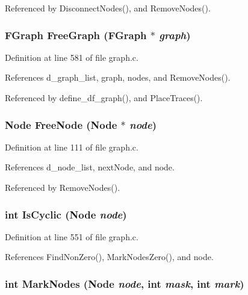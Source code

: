 Referenced by Disconnect\-Nodes(), and Remove\-Nodes().
\subsubsection{\setlength{\rightskip}{0pt plus 5cm}\bf{FGraph} Free\-Graph (\bf{FGraph} $\ast$ {\em graph})}\label{graph_8c_21f7025d01cd1f76fa141deb52814f74}




Definition at line 581 of file graph.c.

References d\_\-graph\_\-list, graph, nodes, and Remove\-Nodes().

Referenced by define\_\-df\_\-graph(), and Place\-Traces().
\subsubsection{\setlength{\rightskip}{0pt plus 5cm}\bf{Node} Free\-Node (\bf{Node} $\ast$ {\em node})}\label{graph_8c_26179fc2f0d21aa44b2e5a57265a52c5}




Definition at line 111 of file graph.c.

References d\_\-node\_\-list, next\-Node, and node.

Referenced by Remove\-Nodes().
\subsubsection{\setlength{\rightskip}{0pt plus 5cm}int Is\-Cyclic (\bf{Node} {\em node})}\label{graph_8c_756ebc836e841a3d41ccd454c890b331}




Definition at line 551 of file graph.c.

References Find\-Non\-Zero(), Mark\-Nodes\-Zero(), and node.
\subsubsection{\setlength{\rightskip}{0pt plus 5cm}int Mark\-Nodes (\bf{Node} {\em node}, int {\em mask}, int {\em mark})}\label{graph_8c_8fb02f1b857bea9d9bf0cc9f163d9bb3}




